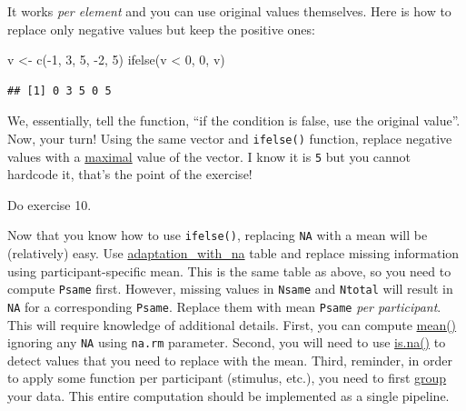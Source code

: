 \documentclass[
]{book}
\newenvironment{Shaded}{\begin{snugshade}}{\end{snugshade}}
\newcommand{\DecValTok}[1]{\textcolor[rgb]{0.00,0.00,0.81}{#1}}
\newcommand{\FunctionTok}[1]{\textcolor[rgb]{0.00,0.00,0.00}{#1}}
\newcommand{\NormalTok}[1]{#1}
\newcommand{\OtherTok}[1]{\textcolor[rgb]{0.56,0.35,0.01}{#1}}
\newcommand{\SpecialCharTok}[1]{\textcolor[rgb]{0.00,0.00,0.00}{#1}}
\begin{document}
It works \emph{per element} and you can use original values themselves. Here is how to replace only negative values but keep the positive ones:

\begin{Shaded}
\begin{Highlighting}[]
\NormalTok{v }\OtherTok{\textless{}{-}} \FunctionTok{c}\NormalTok{(}\SpecialCharTok{{-}}\DecValTok{1}\NormalTok{, }\DecValTok{3}\NormalTok{, }\DecValTok{5}\NormalTok{, }\SpecialCharTok{{-}}\DecValTok{2}\NormalTok{, }\DecValTok{5}\NormalTok{)}
\FunctionTok{ifelse}\NormalTok{(v }\SpecialCharTok{\textless{}} \DecValTok{0}\NormalTok{, }\DecValTok{0}\NormalTok{, v)}
\end{Highlighting}
\end{Shaded}

\begin{verbatim}
## [1] 0 3 5 0 5
\end{verbatim}

We, essentially, tell the function, ``if the condition is false, use the original value''. Now, your turn! Using the same vector and \texttt{ifelse()} function, replace negative values with a \href{https://stat.ethz.ch/R-manual/R-devel/library/base/html/Extremes.html}{maximal} value of the vector. I know it is \texttt{5} but you cannot hardcode it, that's the point of the exercise!

Do exercise 10.

Now that you know how to use \texttt{ifelse()}, replacing \texttt{NA} with a mean will be (relatively) easy. Use \href{data/adaptation_with_na.csv}{adaptation\_with\_na} table and replace missing information using participant-specific mean. This is the same table as above, so you need to compute \texttt{Psame} first. However, missing values in \texttt{Nsame} and \texttt{Ntotal} will result in \texttt{NA} for a corresponding \texttt{Psame}. Replace them with mean \texttt{Psame} \emph{per participant}. This will require knowledge of additional details. First, you can compute \href{https://stat.ethz.ch/R-manual/R-devel/library/base/html/mean.html}{mean()} ignoring any \texttt{NA} using \texttt{na.rm} parameter. Second, you will need to use \href{https://stat.ethz.ch/R-manual/R-devel/library/base/html/NA.html}{is.na()} to detect values that you need to replace with the mean. Third, reminder, in order to apply some function per participant (stimulus, etc.), you need to first \href{https://dplyr.tidyverse.org/reference/group_by.html}{group} your data. This entire computation should be implemented as a single pipeline.
\end{document}
